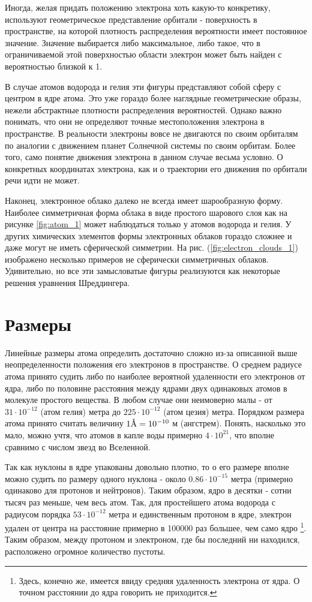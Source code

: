 Иногда, желая придать положению электрона хоть какую-то конкретику, используют геометрическое представление орбитали - поверхность в пространстве, на которой плотность распределения вероятности имеет постоянное значение.
Значение выбирается либо максимальное, либо такое, что в ограничиваемой этой поверхностью области электрон может быть найден с вероятностью близкой к 1.

В случае атомов водорода и гелия эти фигуры представляют собой сферу с центром в ядре атома.
Это уже гораздо более наглядные геометрические образы, нежели абстрактные плотности распределения вероятностей.
Однако важно понимать, что они не определяют точные местоположения электрона в пространстве. 
В реальности электроны вовсе не двигаются по своим орбиталям по аналогии с движением планет Солнечной системы по своим орбитам.
Более того, само понятие движения электрона в данном случае весьма условно.
О конкретных координатах электрона, как и о траектории его движения по орбитали речи идти не может.

Наконец, электронное облако далеко не всегда имеет шарообразную форму.
Наиболее симметричная форма облака в виде простого шарового слоя как на рисунке \ref{fig:atom_1} может наблюдаться только у атомов водорода и гелия.
У других химических элементов формы электронных облаков гораздо сложнее и даже могут не иметь сферической симметрии.
На рис. (\ref{fig:electron_clouds_1}) изображено несколько примеров не сферически симметричных облаков.
Удивительно, но все эти замысловатые фигуры реализуются как некоторые решения уравнения Шреддингера.


\section*{Размеры}

Линейные размеры атома определить достаточно сложно из-за описанной выше неопределенности положения его электронов в пространстве.
О среднем радиусе атома принято судить либо по наиболее вероятной удаленности его электронов от ядра, либо по половине расстояния между ядрами двух одинаковых атомов в молекуле простого вещества.
В любом случае они неимоверно малы - от $31\cdot 10^{-12}$ (атом гелия) метра до $225\cdot 10^{-12}$ (атом цезия) метра.
Порядком размера атома принято считать величину $1\mbox{\normalfont\AA} = 10^{-10}$ м (ангстрем).
Понять, насколько это мало, можно учтя, что атомов в капле воды примерно $4\cdot 10^{21}$, что вполне сравнимо с числом звезд во Вселенной.

Так как нуклоны в ядре упакованы довольно плотно, то о его размере вполне можно судить по размеру одного нуклона - около $0.86\cdot 10^{-15}$ метра (примерно одинаково для протонов и нейтронов). 
Таким образом, ядро в десятки - сотни тысяч раз меньше, чем весь атом.
Так, для простейшего атома водорода с радиусом порядка $53\cdot 10^{-12}$ метра и единственным протоном в ядре, электрон удален от центра на расстояние примерно в 100000 раз большее, чем само ядро \footnote{%
    Здесь, конечно же, имеется ввиду средняя удаленность электрона от ядра.
    О точном расстоянии до ядра говорить не приходится.}.
Таким образом, между протоном и электроном, где бы последний ни находился, расположено огромное количество пустоты.

